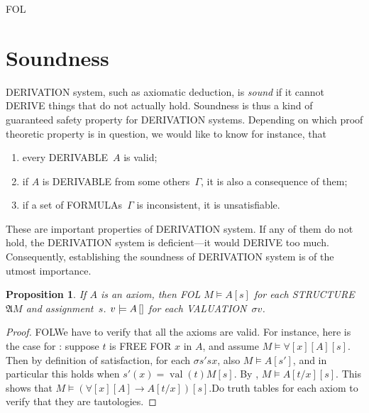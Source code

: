 \documentclass[10pt,a4paper]{article}
\makeatletter
\newcommand*{\olup}[1]{\MakeUppercase{#1}}
\theoremstyle{plain}
\newtheorem{prop}[thm]{Proposition}
\theoremstyle{definition}
\theoremstyle{remark}
\newenvironment{explain}{}{}
\newcommand*{\olfileid}[3]{}
\newcommand*{\olsection}[1]{\section*{#1}}
\newcommand{\olref}{\@ifnextchar[{\olref@i}{\olref@final}}
\def\olref@i[#1]{\@ifnextchar[{\olref@ii}{\olref@final}}
\def\olref@ii[#1]{\@ifnextchar[{\olref@iii}{\olref@final}}
\def\olref@iii[#1]{\olref@final}
\def\olref@final#1{\ref{#1}}
\providecommand{\lif}{\mathbin{\rightarrow}}
\providecommand{\lforall}{\mathord{\forall}}
\providecommand{\Subst}[3]{#1[#2/#3]}
\providecommand{\Struct}{\ensuremath{\mathfrak{A}}}
\providecommand{\Sat}[2]{\ensuremath{#1 \models #2}}
\providecommand{\iftag}[1]{#1}
\providecommand{\Value}[1]{\operatorname{val}(#1)}
\providecommand{\pSat}[3]{#1 \models #2\,[#3]}
\providecommand{\pAssign}{\sigma}
\providecommand{\varAssign}{\sigma}
\providecommand{\iftag}{}
\makeatother
\begin{document}



\iftag{FOL}
      {\olfileid{fol}{axd}{sou}}
      {\olfileid{pl}{axd}{sou}}
      
\olsection{Soundness}

\begin{explain}
\olup{derivation} system, such as axiomatic deduction, is \emph{sound}
if it cannot \olup{derive} things that do not actually hold.  Soundness is
thus a kind of guaranteed safety property for \olup{derivation} systems.
Depending on which proof theoretic property is in question, we would
like to know for instance, that
\begin{enumerate}
\item every \olup{derivable}~$A$ is valid;
\item if $A$ is \olup{derivable} from some others~$\Gamma$, it is also a
  consequence of them;
\item if a set of \olup{formula}s~$\Gamma$ is inconsistent, it is
  unsatisfiable.
\end{enumerate}
These are important properties of \olup{derivation} system.  If any of them do
not hold, the \olup{derivation} system is deficient---it would \olup{derive} too much.
Consequently, establishing the soundness of \olup{derivation} system is of the
utmost importance.
\end{explain}

\begin{prop}
  If $A$ is an axiom, then
  \iftag{FOL}
    {$\Sat{M}{A}[s]$ for each \olup{structure}~$\Struct{M}$ and assignment~$s$.}
    {$\pSat{v}{A}$ for each \olup{valuation}~$\pAssign{v}$.}
\end{prop}

\begin{proof}
\iftag{FOL}{We have to verify that all the axioms are valid. For
  instance, here is the case for \olref[qua]{ax:q1}: suppose $t$ is
  \olup{free for} $x$ in $A$, and assume
  $\Sat{M}{\lforall[x][A]}[s]$. Then by definition of satisfaction,
  for each $\varAssign{s'}{s}{x}$, also $\Sat{M}{A}[s']$, and in particular
  this holds when $s'(x) = \Value{t}{M}[s]$. By
  \olref[syn][ext]{prop:ext-formulas},
  $\Sat{M}{\Subst{A}{t}{x}}[s]$. This shows that
  $\Sat{M}{(\lforall[x][A] \lif \Subst{A}{t}{x})}[s]$.}{Do truth
  tables for each axiom to verify that they are tautologies.}
\end{proof}
\end{document}
